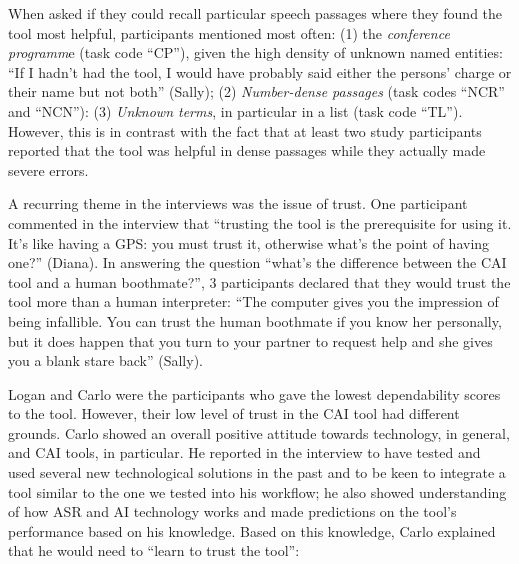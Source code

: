 When asked if they could recall particular speech passages where they found the tool most helpful, participants mentioned most often: (1) the \textit{conference programm}e (task code “CP”), given the high density of unknown named entities: ``If I hadn’t had the tool, I would have probably said either the persons’ charge or their name but not both'' (Sally); (2) \textit{Number-dense passages} (task codes “NCR” and “NCN”): (3) \textit{Unknown terms}, in particular in a list (task code “TL”). However, this is in contrast with the fact that at least two study participants reported that the tool was helpful in dense passages while they actually made severe errors.

A recurring theme in the interviews was the issue of trust. One participant commented in the interview that ``trusting the tool is the prerequisite for using it. It’s like having a GPS: you must trust it, otherwise what’s the point of having one?'' (Diana). In answering the question ``what’s the difference between the CAI tool and a human boothmate?'', 3 participants declared that they would trust the tool more than a human interpreter: ``The computer gives you the impression of being infallible. You can trust the human boothmate if you know her personally, but it does happen that you turn to your partner to request help and she gives you a blank stare back'' (Sally).

Logan and Carlo were the participants who gave the lowest dependability scores to the tool. However, their low level of trust in the CAI tool had different grounds. Carlo showed an overall positive attitude towards technology, in general, and CAI tools, in particular. He reported in the interview to have tested and used several new technological solutions in the past and to be keen to integrate a tool similar to the one we tested into his workflow; he also showed understanding of how ASR and AI technology works and made predictions on the tool’s performance based on his knowledge. Based on this knowledge, Carlo explained that he would need to ``learn to trust the tool'':

